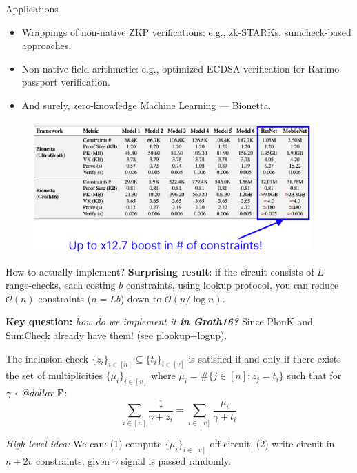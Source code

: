 \documentclass{zkdl-presentation-template}
\makeatletter
\newcommand\leftarrowS{\leftarrow\joinrel\smalldollar}
\newcommand{\smalldollar}{\mathrel{\mathpalette\small@dollar\relax}}
\newcommand{\small@dollar}[2]{%
  \vcenter{\hbox{%
    $#1\textnormal{\fontsize{0.7\dimexpr\f@size pt}{0}\selectfont\$}$%
  }}%
}
\makeatother
\begin{document}
    \begin{frame}{Applications}
        \begin{itemize}
            \item Wrappings of non-native ZKP verifications: e.g., zk-STARKs, 
            sumcheck-based approaches.
            \item Non-native field arithmetic: e.g., optimized ECDSA
            verification for Rarimo passport verification.
            \item And surely, zero-knowledge Machine Learning --- Bionetta.
        \end{itemize}
        \begin{figure}
            \centering
            \includegraphics[width=0.95\textwidth]{images/benchmark.png}
        \end{figure}
    \end{frame}

    \begin{frame}{How to actually implement?}
        \textcolor{blue!70!black}{\textbf{Surprising result}}: if the circuit
        consists of $L$ range-checks, each costing $b$ constraints, using lookup
        protocol, you can reduce \textcolor{blue!70!black}{$\mathcal{O}(n)$}
        constraints ($n=Lb$) down to
        \textcolor{blue!70!black}{$\mathcal{O}(n/\log n)$}.

        \textcolor{blue!70!black}{\textbf{Key question:}} \textit{how do we
        implement it \textbf{in Groth16?}} Since PlonK and SumCheck already have
        them! (see plookup+logup).

        \begin{theorem}
            The inclusion check $\{z_i\}_{i \in [n]} \subseteq \{t_i\}_{i \in
            [v]}$ is satisfied if and only if there exists the set of
            multiplicities $\{\mu_i\}_{i \in [v]}$ where $\mu_i = \#\{j \in [n]:
            z_j = t_i\}$ such that for $\gamma \leftarrowS \mathbb{F}$:
            \begin{equation*}
                \sum_{i \in [n]} \frac{1}{\gamma + z_i} = \sum_{i \in [v]} \frac{\mu_i}{\gamma + t_i}
            \end{equation*}
        \end{theorem}

        \textit{High-level idea:} We can: (1) compute $\{\mu_i\}_{i \in [v]}$
        off-circuit, (2) write circuit in $n+2v$ constraints,
        \textcolor{red!70!black}{given $\gamma$ signal is passed randomly}.
    \end{frame}
\end{document}
